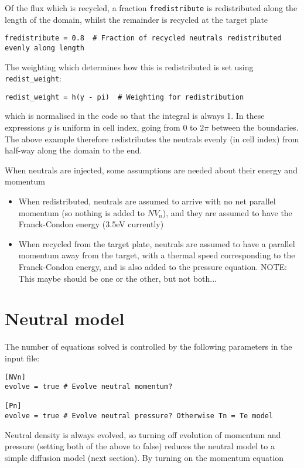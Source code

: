 \documentclass[12pt,a4paper]{article}
\begin{document}
Of the flux which is recycled, a fraction \texttt{fredistribute} is redistributed along the length
of the domain, whilst the remainder is recycled at the target plate
\begin{verbatim}
fredistribute = 0.8  # Fraction of recycled neutrals redistributed evenly along length
\end{verbatim}
The weighting which determines how this is redistributed is set using \texttt{redist\_weight}:
\begin{verbatim}
redist_weight = h(y - pi)  # Weighting for redistribution
\end{verbatim}
which is normalised in the code so that the integral is always 1.
In these expressions $y$ is uniform in cell index, going from $0$ to $2\pi$ between the boundaries. The
above example therefore redistributes the neutrals evenly (in cell index) from half-way along the domain to the end.

When neutrals are injected, some assumptions are needed about their energy and momentum
\begin{itemize}
\item When redistributed, neutrals are assumed to arrive with no net parallel momentum (so nothing is added to $NV_n$),
  and they are assumed to have the Franck-Condon energy (3.5eV currently)
\item When recycled from the target plate, neutrals are assumed to have a parallel momentum away from the target,
  with a thermal speed corresponding to the Franck-Condon energy, and is also added to the pressure equation.
  NOTE: This maybe should be one or the other, but not both...
\end{itemize}

\section{Neutral model}

The number of equations solved is controlled by the following parameters in the input file:
\begin{verbatim}
[NVn]
evolve = true # Evolve neutral momentum?

[Pn]
evolve = true # Evolve neutral pressure? Otherwise Tn = Te model
\end{verbatim}

Neutral density is always evolved, so turning off evolution of momentum and pressure
(setting both of the above to false) reduces the neutral model to a simple diffusion
model (next section). By turning on the momentum equation 
\end{document}
